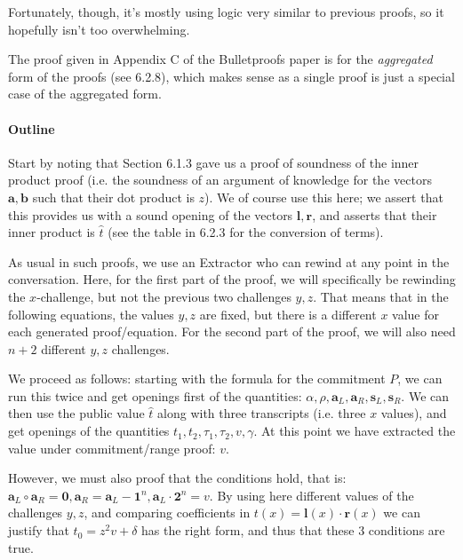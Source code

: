 \documentclass[10pt,a4paper]{article}
\begin{document}
Fortunately, though, it's mostly using logic very similar to previous
proofs, so it hopefully isn't too overwhelming.

The proof given in Appendix C of the Bulletproofs paper is for the
\emph{aggregated} form of the proofs (see 6.2.8), which makes sense as a
single proof is just a special case of the aggregated form.

\hypertarget{outline}{%
\paragraph[Outline]{\texorpdfstring{\protect\hypertarget{anchor-64}{}{}Outline}{Outline}}\label{outline}}

Start by noting that Section 6.1.3 gave us a proof of soundness of the
inner product proof (i.e. the soundness of an argument of knowledge for
the vectors $\mathbf{a}, \mathbf{b}$ such that their dot product is $z$). We of course use this
here; we assert that this provides us with a sound opening of the
vectors $\mathbf{l}, \mathbf{r}$, and asserts that their inner product is $\hat{t}$ (see the table in
6.2.3 for the conversion of terms).

As usual in such proofs, we use an Extractor who can rewind at any point
in the conversation. Here, for the first part of the proof, we will
specifically be rewinding the $x$-challenge, but not the previous two
challenges $y,z$. That means that in the following equations, the values $y,z$ are
fixed, but there is a different $x$ value for each generated proof/equation.
For the second part of the proof, we will also need $n+2$ different $y,z$
challenges.

We proceed as follows: starting with the formula for the commitment $P$, we
can run this twice and get openings first of the quantities: $\alpha, \rho, \textbf{a}_L, \textbf{a}_R, \textbf{s}_L, \textbf{s}_R$. We can
then use the public value $\hat{t}$ along with three transcripts (i.e. three $x$
values), and get openings of the quantities $t_1, t_2, \tau_1, \tau_2, v, \gamma$. At this point we have
extracted the value under commitment/range proof: $v$.

However, we must also proof that the conditions hold, that is: $\textbf{a}_L \circ \textbf{a}_R = \textbf{0}, \textbf{a}_R = \textbf{a}_L - \textbf{1}^n, \textbf{a}_L \cdot \textbf{2}^n = v$. By
using here different values of the challenges $y,z$, and comparing
coefficients in $t(x) = \textbf{l}(x) \cdot \textbf{r}(x)$ we can justify that $t_0 = z^2v + \delta$ has the right form, and thus that
these 3 conditions are true.
\end{document}
